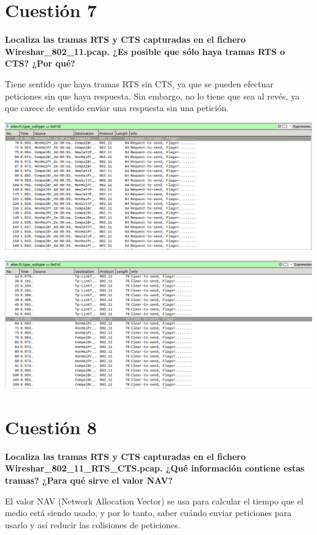 \documentclass{article}
\begin{document}
\section{Cuestión 7}

\textbf{Localiza las tramas RTS y CTS capturadas en el fichero Wireshar\_802\_11.pcap. ¿Es
posible que sólo haya tramas RTS o CTS? ¿Por qué?}

Tiene sentido que haya tramas RTS sin CTS, ya que se pueden efectuar peticiones sin que haya respuesta. Sin embargo, no lo tiene que sea al revés, ya que carece de sentido enviar una respuesta sin una petición.

\begin{center}
\includegraphics[scale=0.3]{WLAN/rts.png}
\end{center}
\begin{center}
\includegraphics[scale=0.3]{WLAN/cts.png}
\end{center}

\section{Cuestión 8}

\textbf{Localiza las tramas RTS y CTS capturadas en el fichero
Wireshar\_802\_11\_RTS\_CTS.pcap. ¿Qué información contiene estas tramas? ¿Para qué sirve
el valor NAV?}

El valor NAV (Network Allocation Vector) se usa para calcular el tiempo que el medio está siendo usado, y por lo tanto, saber cuándo enviar peticiones para usarlo y así reducir las colisiones de peticiones.
\end{document}
